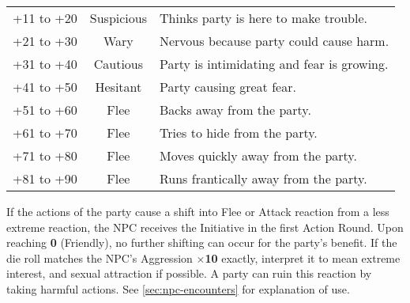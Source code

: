 \begin{table}[htbp]
{\begin{minipage}{0.75\textwidth}
\begin{tabular}{ccl}
        \rowcolor{grey}
        +11 to +20 & Suspicious & Thinks party is here to make trouble.\\
        +21 to +30 & Wary & Nervous because party could cause harm.\\
        \rowcolor{grey}
        +31 to +40 & Cautious & Party is intimidating and fear is
        growing.\\
        +41 to +50 & Hesitant & Party causing great fear.\\
        \rowcolor{grey}
        +51 to +60 & Flee & Backs away from the party.\\
        +61 to +70 & Flee & Tries to hide from the party.\\
        \rowcolor{grey}
        +71 to +80 & Flee & Moves quickly away from the party.\\
        +81 to +90 & Flee & Runs frantically away from the party.
      \end{tabular} 

      \medskip
      
      \parbox{\textwidth}{If the actions of the party cause a shift
        into Flee or Attack reaction from a less extreme reaction, the
        NPC receives the Initiative in the first Action Round. Upon
        reaching \textbf{0} (Friendly), no further shifting can occur
        for the party's benefit. If the die roll matches the NPC's
        Aggression \textbf{$\times$10} exactly, interpret it to mean
        extreme interest, and sexual attraction if possible. A party
        can ruin this reaction by taking harmful actions.  See
        \ref{sec:npc-encounters} for explanation of use.}

      \medskip


\end{minipage}}
\end{table}
